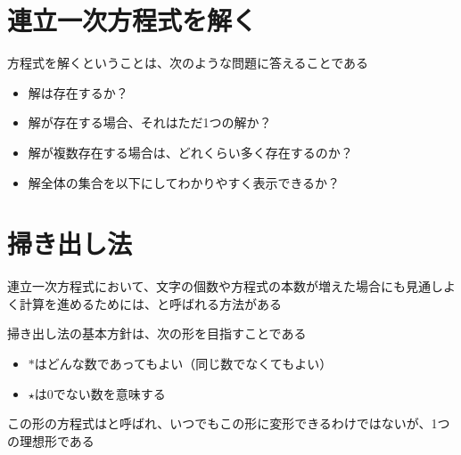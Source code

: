 \documentclass[../../../topic_linear-equation]{subfiles}
\begin{document}
\sectionline
\section{連立一次方程式を解く}

方程式を解くということは、次のような問題に答えることである

\begin{itemize}
  \item 解は存在するか？
  \item 解が存在する場合、それはただ1つの解か？
  \item 解が複数存在する場合は、どれくらい多く存在するのか？
  \item 解全体の集合を以下にしてわかりやすく表示できるか？
\end{itemize}

\sectionline
\section{掃き出し法}

連立一次方程式において、文字の個数や方程式の本数が増えた場合にも見通しよく計算を進めるためには、と呼ばれる方法がある

\br

掃き出し法の基本方針は、次の形を目指すことである

\begin{center}
\end{center}

\begin{itemize}
  \item $*$はどんな数であってもよい（同じ数でなくてもよい）
  \item $\star$は0でない数を意味する
\end{itemize}

この形の方程式はと呼ばれ、いつでもこの形に変形できるわけではないが、1つの理想形である
\end{document}
